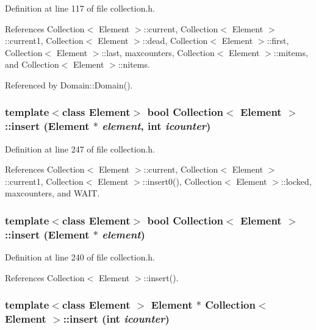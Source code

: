 Definition at line 117 of file collection.h.

References Collection$<$ Element $>$::current, Collection$<$ Element $>$::current1, Collection$<$ Element $>$::dead, Collection$<$ Element $>$::first, Collection$<$ Element $>$::last, maxcounters, Collection$<$ Element $>$::mitems, and Collection$<$ Element $>$::nitems.

Referenced by Domain::Domain().\hypertarget{classCollection_9a79776d894a27aea555a5a50ed5d073}{
\subsubsection[{insert}]{\setlength{\rightskip}{0pt plus 5cm}template$<$class Element$>$ bool {\bf Collection}$<$ Element $>$::insert (Element $\ast$ {\em element}, \/  int {\em icounter})}}
\label{classCollection_9a79776d894a27aea555a5a50ed5d073}




Definition at line 247 of file collection.h.

References Collection$<$ Element $>$::current, Collection$<$ Element $>$::current1, Collection$<$ Element $>$::insert0(), Collection$<$ Element $>$::locked, maxcounters, and WAIT.\hypertarget{classCollection_80e96043819f7cc78bf4a8f51aa12b2e}{
\subsubsection[{insert}]{\setlength{\rightskip}{0pt plus 5cm}template$<$class Element$>$ bool {\bf Collection}$<$ Element $>$::insert (Element $\ast$ {\em element})}}
\label{classCollection_80e96043819f7cc78bf4a8f51aa12b2e}




Definition at line 240 of file collection.h.

References Collection$<$ Element $>$::insert().\hypertarget{classCollection_dafbeadb36716406356b4824c5eff6e9}{
\subsubsection[{insert}]{\setlength{\rightskip}{0pt plus 5cm}template$<$class Element $>$ Element $\ast$ {\bf Collection}$<$ Element $>$::insert (int {\em icounter})}}
\label{classCollection_dafbeadb36716406356b4824c5eff6e9}





